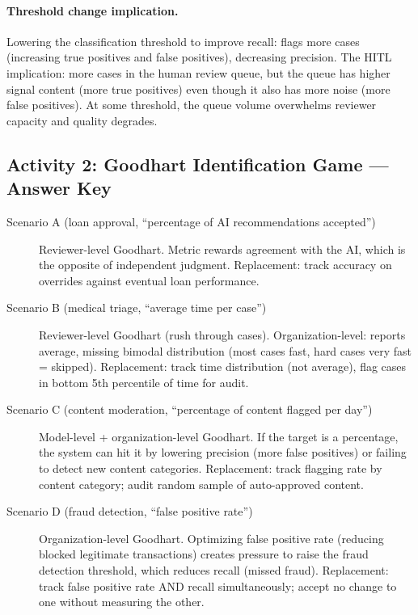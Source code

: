 \paragraph{Threshold change implication.}

Lowering the classification threshold to improve recall: flags more cases (increasing true positives and false positives), decreasing precision. The HITL implication: more cases in the human review queue, but the queue has higher signal content (more true positives) even though it also has more noise (more false positives). At some threshold, the queue volume overwhelms reviewer capacity and quality degrades.

\subsection{Activity 2: Goodhart Identification Game --- Answer Key}

\begin{description}
    \item[Scenario A (loan approval, ``percentage of AI recommendations accepted'')] Reviewer-level Goodhart. Metric rewards agreement with the AI, which is the opposite of independent judgment. Replacement: track accuracy on overrides against eventual loan performance.

    \item[Scenario B (medical triage, ``average time per case'')] Reviewer-level Goodhart (rush through cases). Organization-level: reports average, missing bimodal distribution (most cases fast, hard cases very fast = skipped). Replacement: track time distribution (not average), flag cases in bottom 5th percentile of time for audit.

    \item[Scenario C (content moderation, ``percentage of content flagged per day'')] Model-level + organization-level Goodhart. If the target is a percentage, the system can hit it by lowering precision (more false positives) or failing to detect new content categories. Replacement: track flagging rate by content category; audit random sample of auto-approved content.

    \item[Scenario D (fraud detection, ``false positive rate'')] Organization-level Goodhart. Optimizing false positive rate (reducing blocked legitimate transactions) creates pressure to raise the fraud detection threshold, which reduces recall (missed fraud). Replacement: track false positive rate AND recall simultaneously; accept no change to one without measuring the other.
\end{description}

